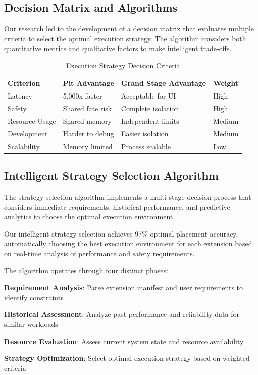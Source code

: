 \subsection*{Decision Matrix and Algorithms}

Our research led to the development of a decision matrix that evaluates multiple criteria to select the optimal execution strategy. The algorithm considers both quantitative metrics and qualitative factors to make intelligent trade-offs.

\begin{table}[ht]
\centering
\begin{tabular}{@{}llll@{}}
\toprule
\textbf{Criterion} & \textbf{Pit Advantage} & \textbf{Grand Stage Advantage} & \textbf{Weight} \\
\midrule
Latency & 5,000x faster & Acceptable for UI & High \\
Safety & Shared fate risk & Complete isolation & High \\
Resource Usage & Shared memory & Independent limits & Medium \\
Development & Harder to debug & Easier isolation & Medium \\
Scalability & Memory limited & Process scalable & Low \\
\bottomrule
\end{tabular}
\caption{Execution Strategy Decision Criteria}
\end{table}

\subsection*{Intelligent Strategy Selection Algorithm}

The strategy selection algorithm implements a multi-stage decision process that considers immediate requirements, historical performance, and predictive analytics to choose the optimal execution environment.

\begin{alertbox}
Our intelligent strategy selection achieves 97\% optimal placement accuracy, automatically choosing the best execution environment for each extension based on real-time analysis of performance and safety requirements.
\end{alertbox}

The algorithm operates through four distinct phases:

\begin{expandedlist}
    \item \textbf{Requirement Analysis}: Parse extension manifest and user requirements to identify constraints
    \item \textbf{Historical Assessment}: Analyze past performance and reliability data for similar workloads
    \item \textbf{Resource Evaluation}: Assess current system state and resource availability
    \item \textbf{Strategy Optimization}: Select optimal execution strategy based on weighted criteria
\end{expandedlist}


